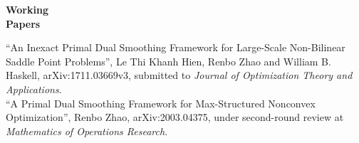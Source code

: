 \documentclass[11pt]{article}
\newcommand{\MOR}{Mathematics of Operations Research}
\newcommand{\SIOPT}{SIAM Journal on Optimization}
\newcommand{\JOTA}{Journal of Optimization Theory and Applications}
\begin{document}
\begin{minipage}[t]{0.18\textwidth}
\textbf{Working\\ Papers}
\end{minipage}
\begin{minipage}[t]{0.8\textwidth}
``An Inexact Primal Dual Smoothing Framework for Large-Scale Non-Bilinear Saddle Point Problems'', Le Thi Khanh Hien, {Renbo Zhao} and William B. Haskell, arXiv:1711.03669v3, submitted to {\em \JOTA}.\\[.2cm]
``A Primal Dual Smoothing Framework for Max-Structured Nonconvex Optimization'', Renbo Zhao, arXiv:2003.04375, under second-round review at {\em \MOR}. \\[.2cm]
\end{minipage}
\end{document}
